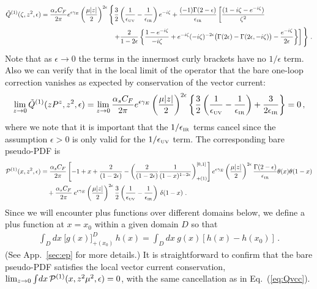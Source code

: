 \documentclass[prd,aps,twocolumn,preprintnumbers,showpacs,nofootinbib,superscriptaddress,notitlepage]{revtex4-1}
\newcommand{\beq}{\begin{eqnarray}}
\newcommand{\eeq}{\end{eqnarray}}
\newcommand{\nn}{\nonumber}
\DeclareRobustCommand{\app}[1]{App.~\ref{sec:#1}}
\DeclareRobustCommand{\eq}[1]{Eq.~(\ref{eq:#1})}
\DeclareRobustCommand{\app}[1]{App.~\ref{sec:#1}}
\begin{document}
\begin{widetext}
\begin{align} \label{eq:1loopioffe}
\tilde{Q}^{(1)}(\zeta,z^2,\epsilon)
&= {\alpha_sC_F\over 2\pi}e^{\epsilon\gamma_E} \left({\mu|z|\over2}\right)^{2\epsilon} \Bigg\{
 {3\over2}\left({1\over \epsilon_{\mbox{\tiny UV}}}-{1\over \epsilon_{\mbox{\tiny IR}}}\right)e^{-i\zeta}
 +  \frac{(-1)\Gamma(2-\epsilon)}{\epsilon_{\mbox{\tiny IR}}}
  \left[ {(1-i\zeta - e^{-i\zeta})\over \zeta^2}
 \right.
 \\
& \qquad\qquad\qquad\qquad\qquad\quad \left.
 +{2\over 1-2\epsilon}\left\{ {1-e^{-i\zeta}\over -i\zeta} + e^{-i\zeta}(-i\zeta)^{-2\epsilon}
 \big(\Gamma(2\epsilon)-\Gamma(2\epsilon,-i\zeta)\big) - \frac{e^{-i\zeta}}{2\epsilon} \right\} \right]
 \Bigg\}\ . \nn
\end{align}
Note that as $\epsilon\to 0$ the terms in the innermost curly brackets have no $1/\epsilon$ term.  Also we can verify that in the local limit of the operator that the bare one-loop correction vanishes as expected by conservation of the vector current:
\begin{align} \label{eq:Qvcc}
\lim_{z\to 0} \tilde{Q}^{(1)}(z P^z,z^2,\epsilon)
  = \lim_{z\to 0}  {\alpha_sC_F\over 2\pi}e^{\epsilon\gamma_E} \left({\mu|z|\over2}\right)^{2\epsilon} \bigg\{
 {3\over2}\left({1\over \epsilon_{\mbox{\tiny UV}}}-{1\over \epsilon_{\mbox{\tiny IR}}}\right)
  + \frac{3}{2\epsilon_{\mbox{\tiny IR}}} \bigg\} = 0
 \,,
\end{align}
where we note that it is important that the $1/\epsilon_{\mbox{\tiny IR}}$ terms cancel since the assumption $\epsilon>0$ is only valid for the $1/\epsilon_{\mbox{\tiny UV}}$ term.
The corresponding bare pseudo-PDF is
\begin{align}\label{eq:1looppseudo}
{\cal P}^{(1)}(x,z^2,\epsilon)
 &= {\alpha_sC_F\over 2\pi} \left[-1+x + \frac{2}{(1-2\epsilon)} -
 \left( {2\over (1-2\epsilon)}{1\over (1-x)^{1-2\epsilon}}\right)^{[0,1]}_{+(1)}\right]e^{\epsilon\gamma_E}\left({\mu|z|\over2}\right)^{2\epsilon} \frac{\Gamma(2-\epsilon)}{\epsilon_{\mbox{\tiny IR}}} \theta(x)\theta(1-x)\nonumber\\
 &\quad +{\alpha_sC_F\over 2\pi} \:
  e^{\epsilon\gamma_E}\left({\mu|z|\over2}\right)^{2\epsilon}{3\over2}\left({1\over \epsilon_{\mbox{\tiny UV}}}-{1\over \epsilon_{\mbox{\tiny IR}}}\right)\, \delta(1-x)
\ .
\end{align}
Since we will encounter plus functions over different domains below, we define a plus function at $x=x_0$ within a given domain $D$ so that
\beq
	\int_D dx\ \big[ g(x)\big]_{+(x_0)}^D\, h(x) = \int_D dx\ g(x) \left[ h(x) - h(x_0)\right]\,.
\eeq
(See \app{ep} for more details.)
It is straightforward to confirm that the bare pseudo-PDF satisfies the local vector current conservation, $\lim_{z\to 0} \int\! dx \, {\cal P}^{(1)}(x,z^2\mu^2,\epsilon) =0$, with the same cancellation as in \eq{Qvcc}. 	
	

\end{widetext}
\end{document}
